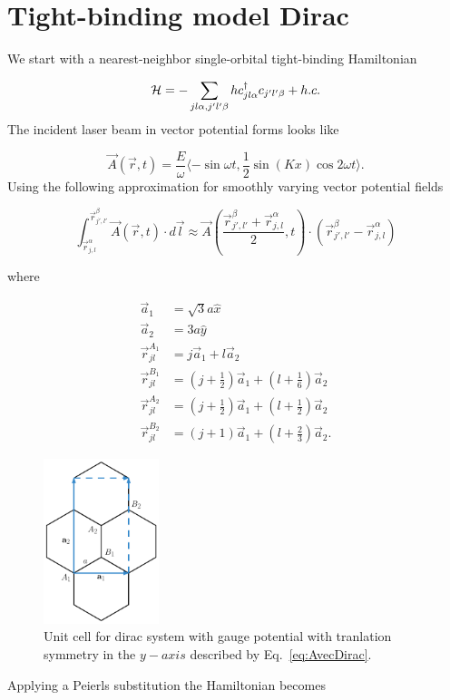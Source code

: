 \section{Tight-binding model Dirac}\label{app:tbm-dirac}

We start with a nearest-neighbor single-orbital tight-binding Hamiltonian

\begin{equation}
  \mathcal{H} = - \sum_{jl\alpha,j'l'\beta} h c^{\dagger}_{jl\alpha} c_{j'l'\beta} + h.c.
\end{equation}
The incident laser beam in vector potential forms looks like

\begin{equation} \label{eq:AvecDirac}
  \vec{A}(\vec{r},t) = \dfrac{E}{\omega} \langle -\sin \omega t, \dfrac{1}{2} \sin(Kx) \cos 2\omega t \rangle.
\end{equation}
Using the following approximation for smoothly varying vector potential fields

\begin{equation}
  \int_{\vec{r}_{j,l}^{\alpha}} ^{\vec{r}_{j',l'}^{\beta}} \vec{A}(\vec{r},t) \cdot d\vec{l} \approx \vec{A} \left( \dfrac{ \vec{r}_{j',l'}^{\beta} + \vec{r}_{j,l}^{\alpha} }{2}, t \right) \cdot \left( \vec{r}_{j',l'}^{\beta} - \vec{r}_{j,l}^{\alpha} \right)
\end{equation}


where

\begin{align}
  \vec{a}_1 &= \sqrt{3}a\hat{x} \\
  \vec{a}_2 &= 3a\hat{y} \\
  \vec{r}_{jl}^{A_1} &= j\vec{a}_1 + l\vec{a}_2 \\
  \vec{r}_{jl}^{B_1} &= (j+\tfrac{1}{2})\vec{a}_1 + (l+\tfrac{1}{6})\vec{a}_2 \\
  \vec{r}_{jl}^{A_2} &= (j+\tfrac{1}{2})\vec{a}_1 + (l+\tfrac{1}{2})\vec{a}_2 \\
  \vec{r}_{jl}^{B_2} &= (j+1)\vec{a}_1 + (l+\tfrac{2}{3})\vec{a}_2.
\end{align}

\begin{figure}[h]
  \includegraphics[width=0.30\textwidth]{./figures/dirac-floquet-unit-cell.pdf}
\caption{Unit cell for dirac system with gauge potential with tranlation symmetry in the $y-axis$ described by Eq.~\eqref{eq:AvecDirac}.}
  \label{fig:dirac-floquet-unit-cell}
\end{figure}
Applying a Peierls substitution the Hamiltonian becomes

